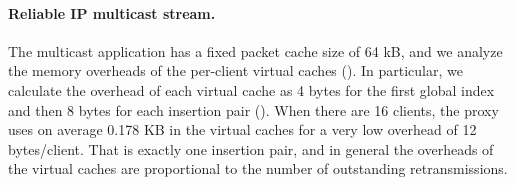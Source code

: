 \paragraph{Reliable IP multicast stream.}

The multicast application has a fixed packet cache size of 64 kB, and we analyze
the memory overheads of the per-client virtual caches ().
In particular, we calculate the overhead of each virtual cache as 4 bytes for
the first global index and then 8 bytes for each insertion pair
(). When there are 16 clients, the proxy
uses on average 0.178 KB in the virtual caches for a very low overhead of 12
bytes/client. That is exactly one insertion pair, and in general the overheads
of the virtual caches are proportional to the number of outstanding
retransmissions.
